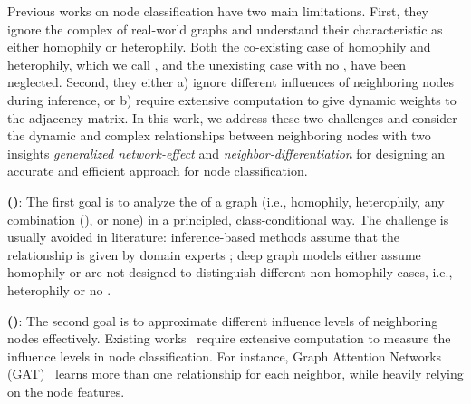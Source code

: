 Previous works on node classification have two main limitations.
First, they ignore the complex \neteffect of real-world graphs and understand their characteristic as either homophily or heterophily.
Both the co-existing case of homophily and heterophily, which we call \xophily, and the unexisting case with no \neteffect, have been neglected.
Second, they either 
a) ignore different influences of neighboring nodes during inference, or 
b) require extensive computation to give dynamic weights to the adjacency matrix.
In this work, we address these two challenges and consider the dynamic and complex relationships between neighboring nodes with two insights \emph{generalized network-effect} and \emph{neighbor-differentiation} for designing an accurate and efficient approach for node classification.

{\bf \nef (\neteffect)}:
The first goal is to analyze the \neteffect of a graph (i.e., homophily, heterophily, any combination (\xophily), or none) in a principled, class-conditional way.
The challenge is usually avoided in literature:
inference-based methods assume that the relationship is given by domain experts \cite{DBLP:journals/pvldb/GatterbauerGKF15};
deep graph models either assume homophily \cite{kipf2016semi, wu2019simplifying} or are not designed to distinguish different non-homophily cases, i.e., heterophily or no \nef \cite{zhu2020beyond, lim2021large}.

{\bf \nd (\ndiff)}:
The second goal is to approximate different influence levels of neighboring nodes effectively.
Existing works~\cite{eswaran2020higher, velivckovic2017graph} require extensive computation to measure the influence levels in node classification.
For instance, Graph Attention Networks (GAT)~\cite{velivckovic2017graph} learns more than one relationship for each neighbor, while heavily relying on the node features.

